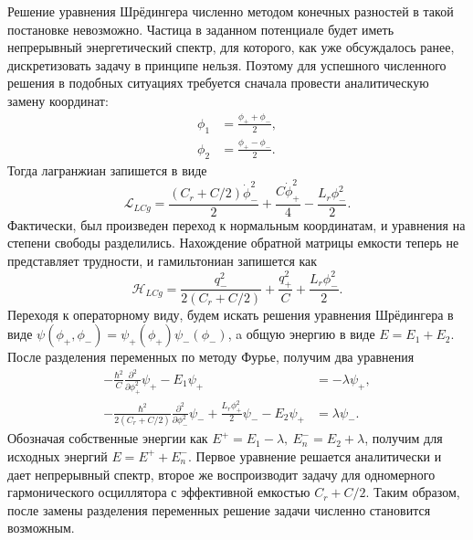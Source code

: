 \documentclass[14pt, a4paper]{extreport}
\numberwithin{equation}{section}
\begin{document}
Решение уравнения Шрёдингера численно методом конечных разностей в такой постановке невозможно. Частица в заданном потенциале будет иметь непрерывный энергетический спектр, для которого, как уже обсуждалось ранее, дискретизовать задачу в принципе нельзя. Поэтому для успешного численного решения в подобных ситуациях требуется сначала провести аналитическую замену координат:
\begin{equation}
	\begin{aligned}
		\phi_1 &= \frac{\phi_+ + \phi_-}{2},\\
		\phi_2 &= \frac{\phi_+ - \phi_-}{2}.
	\end{aligned}
\end{equation}
Тогда лагранжиан запишется в виде
\begin{equation}
	\mathcal{L}_{LCg} = \frac{(C_r+C/2)\dot\phi_-^2}{2}  + \frac{C \dot\phi_+^2}{4} - \frac{L_r \phi_-^2}{2}.
\end{equation}
Фактически, был произведен переход к нормальным координатам, и уравнения на степени свободы разделились. Нахождение обратной матрицы емкости теперь не представляет трудности, и гамильтониан запишется как 
\begin{equation}
	\mathcal{H}_{LCg} = \frac{q_-^2}{2(C_r+C/2)} + \frac{q_+^2}{C} + \frac{L_r \phi_-^2}{2}.
\end{equation}
Переходя к операторному виду, будем искать решения уравнения Шрёдингера в виде $\psi(\phi_+, \phi_-) = \psi_+(\phi_+)\psi_-(\phi_-)$, a общую энергию в виде $E = E_1+E_2$. После разделения переменных по методу Фурье, получим два уравнения
\begin{equation}
	\begin{aligned}
	-\frac{\hbar^2}{C}\frac{\partial^2}{\partial \phi_+^2}\psi_+ - E_1\psi_+ &= - \lambda\psi_+,\\
	-\frac{\hbar^2}{2(C_r + C/2)}\frac{\partial^2}{\partial \phi_-^2}\psi_- + \frac{L_r \phi_+^2}{2}\psi_- - E_2\psi_+ &= \lambda\psi_-.
	\end{aligned}
\end{equation}
Обозначая собственные энергии как $E^+ = E_1 - \lambda,\ E_n^- = E_2 + \lambda$, получим для исходных энергий $E = E^+ + E_n^-$. Первое уравнение решается аналитически и дает непрерывный спектр, второе же воспроизводит задачу для одномерного гармонического осциллятора с эффективной емкостью $C_r+C/2$. Таким образом, после замены разделения переменных решение задачи численно становится возможным. 
\end{document}
